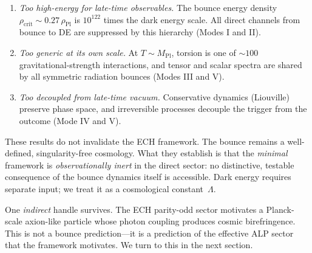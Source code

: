\begin{enumerate}
\item \emph{Too high-energy for late-time observables.}  The bounce energy
  density $\rho_\mathrm{crit} \sim 0.27\,\rho_\mathrm{Pl}$ is $10^{122}$
  times the dark energy scale.  All direct channels from bounce to DE are
  suppressed by this hierarchy (Modes I and II).

\item \emph{Too generic at its own scale.}  At $T \sim M_\mathrm{Pl}$,
  torsion is one of $\sim 100$ gravitational-strength interactions, and tensor
  and scalar spectra are shared by all symmetric radiation bounces (Modes III
  and V).

\item \emph{Too decoupled from late-time vacuum.}  Conservative dynamics
  (Liouville) preserve phase space, and irreversible processes decouple the
  trigger from the outcome (Mode IV and V).
\end{enumerate}

\noindent These results do not invalidate the ECH framework.  The bounce
remains a well-defined, singularity-free cosmology.  What they establish is
that the \emph{minimal} framework is \emph{observationally inert} in the
direct sector: no distinctive, testable consequence of the bounce dynamics
itself is accessible.  Dark energy requires separate input; we treat it as a
cosmological constant~$\Lambda$.

One \emph{indirect} handle survives.  The ECH parity-odd sector motivates a
Planck-scale axion-like particle whose photon coupling produces cosmic
birefringence.  This is not a bounce prediction---it is a prediction of the
effective ALP sector that the framework motivates.  We turn to this in the
next section.
